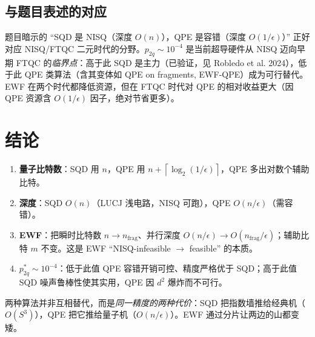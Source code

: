 \documentclass[11pt]{article}
\newcommand{\eps}{\epsilon}
\newcommand{\Oof}[1]{O(#1)}
\newcommand{\ceil}[1]{\left\lceil #1 \right\rceil}
\begin{document}
\subsection{与题目表述的对应}
题目暗示的 ``SQD 是 NISQ（深度 $\Oof{n}$），QPE 是容错（深度 $\Oof{1/\eps}$）'' 正好对应 NISQ/FTQC 二元时代的分野。$p_{2q}\sim 10^{-4}$ 是当前超导硬件从 NISQ 迈向早期 FTQC 的\emph{临界点}：高于此 SQD 是主力（已验证，见 Robledo et al. 2024），低于此 QPE 类算法（含其变体如 QPE on fragments, EWF-QPE）成为可行替代。EWF 在两个时代都降低资源，但在 FTQC 时代对 QPE 的相对收益更大（因 QPE 资源含 $\Oof{1/\eps}$ 因子，绝对节省更多）。

\section{结论}
\begin{enumerate}
  \item \textbf{量子比特数}：SQD 用 $n$，QPE 用 $n+\ceil{\log_2(1/\eps)}$，QPE 多出对数个辅助比特。
  \item \textbf{深度}：SQD $\Oof{n}$（LUCJ 浅电路，NISQ 可跑），QPE $\Oof{n/\eps}$（需容错）。
  \item \textbf{EWF}：把瞬时比特数 $n\to n_{\mathrm{frag}}$、并行深度 $\Oof{n/\eps}\to\Oof{n_{\mathrm{frag}}/\eps}$；辅助比特 $m$ 不变。这是 EWF ``NISQ-infeasible $\to$ feasible'' 的本质。
  \item \textbf{$p_{2q}^\ast\sim 10^{-4}$}：低于此值 QPE 容错开销可控、精度严格优于 SQD；高于此值 SQD 噪声鲁棒性使其实用，QPE 因 $d^2$ 爆炸而不可行。
\end{enumerate}

两种算法并非互相替代，而是\emph{同一精度的两种代价}：SQD 把指数墙推给经典机（$\Oof{S^3}$），QPE 把它推给量子机（$\Oof{n/\eps}$）。EWF 通过分片让两边的山都变矮。
\end{document}
